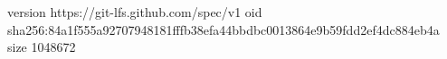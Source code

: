 version https://git-lfs.github.com/spec/v1
oid sha256:84a1f555a92707948181fffb38efa44bbdbc0013864e9b59fdd2ef4dc884eb4a
size 1048672
